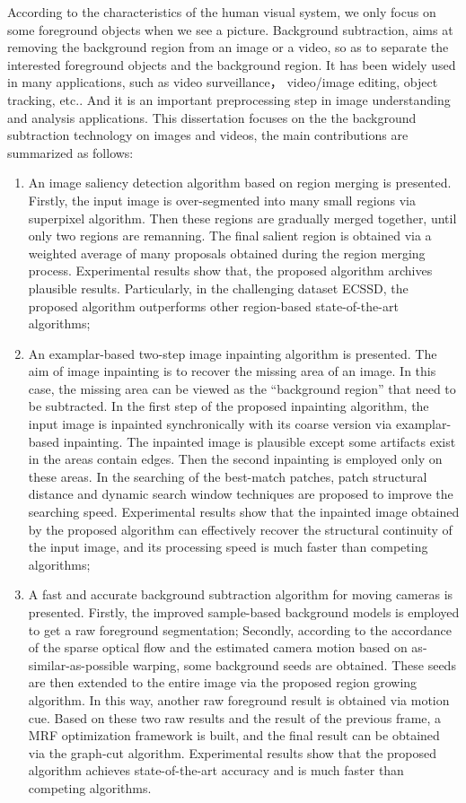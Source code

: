 \begin{eabstract}
   According to the characteristics of the human visual system, we only focus on some foreground objects when we see a picture. Background subtraction, aims at removing the background region from an image or a video, so as to separate the interested foreground objects and the background region. It has been widely used in many applications, such as video surveillance， video/image editing, object tracking, etc.. And it is an important preprocessing step in image  understanding and analysis applications. This dissertation focuses on the the background subtraction technology on images and videos, the main contributions are summarized as follows:
   \begin{enumerate}
   \item An image saliency detection algorithm based on region merging is presented. Firstly, the input image is over-segmented into many small regions via superpixel algorithm. Then these regions are gradually merged together, until only two regions are remanning. The final salient region is obtained via a weighted average of many proposals obtained during the region merging process. Experimental results show that, the proposed algorithm archives plausible results. Particularly, in the challenging dataset ECSSD, the proposed algorithm outperforms other region-based state-of-the-art algorithms;
   \item An examplar-based two-step image inpainting algorithm is presented. The aim of image inpainting is to recover the missing area of an image. In this case, the missing area can be viewed as the ``background region''  that need to be subtracted. In the first step of the proposed inpainting algorithm, the input image is inpainted synchronically with its coarse version via examplar-based inpainting. The inpainted image is plausible except some artifacts exist in the areas contain edges. Then the second inpainting is employed only on these areas. In the searching of the best-match patches, patch structural distance and dynamic search window techniques are proposed to improve the searching speed. Experimental results show that the inpainted image obtained by the proposed algorithm can effectively recover the structural continuity of the input image, and its processing speed is much faster than competing algorithms;
   \item A fast and accurate background subtraction algorithm for moving cameras is presented. Firstly, the improved sample-based background models is employed to get a raw foreground segmentation; Secondly, according to the accordance of the sparse optical flow and the estimated camera motion based on as-similar-as-possible warping, some background seeds are obtained. These seeds are then extended to the entire image via the proposed region growing algorithm. In this way, another raw foreground result is obtained via motion cue. Based on these two raw results and the result of the previous frame, a MRF optimization framework is built, and the final result can be obtained via the graph-cut algorithm. Experimental results show that the proposed algorithm achieves state-of-the-art accuracy and is much faster than competing algorithms.


\end{enumerate}
\end{eabstract}
